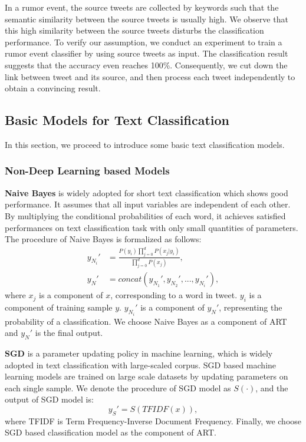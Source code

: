 In a rumor event, the source tweets are collected by keywords such that the semantic similarity between the source tweets is usually high. We observe that this high similarity between the source tweets disturbs the classification performance. To verify our assumption, we conduct an experiment to train a rumor event classifier by using source tweets as input. The classification result suggests that the accuracy even reaches 100\%. Consequently, we cut down the link between tweet and its source, and then process each tweet independently to obtain a convincing result. 

\subsection{Basic Models for Text Classification}
\label{sec:deeplearning_model} 
In this section, we proceed to introduce some basic text classification models.

\subsubsection{Non-Deep Learning based Models}
\textbf{Naive Bayes} \cite{DBLP:journals/ml/DomingosP97} is widely adopted for short text classification which shows good performance. It assumes that all input variables are independent of each other. By multiplying the conditional probabilities of each word, it achieves satisfied performances on text classification task with only small quantities of parameters. The procedure of Naive Bayes is formalized as follows:
\begin{align}\label{eq:nb}
y_{N_{i}}' &= \frac{P(y_i)\prod_{j = 0}^d P(x_j|y_i)}{\prod_{j = 0}^d P(x_j)},\\
y_N' &= concat(y_{N_{1}}',y_{N_{2}}',..., y_{N_{i}}'),
\end{align}
where $x_j$ is a component of $x$, corresponding to a word in tweet.  $y_i$ is a component of training sample $y$. $y_{N_{i}}'$ is a component of $y_N'$, representing the probability of a classification. We choose Naive Bayes as  a component of ART and  $y_N'$ is the final output.

\textbf{SGD} \cite{avriel2003nonlinear} is a parameter updating policy in machine learning, which is widely adopted in text classification with large-scaled corpus. SGD based machine learning models are trained on large scale datasets by updating parameters on each single sample. We denote the procedure of SGD model as $S(\cdot)$, and the output of SGD model is:
\begin{equation}\label{eq:sgd}
y_S' = S(TFIDF(x)),
\end{equation}
where TFIDF is Term Frequency-Inverse Document Frequency. Finally, we choose SGD based classification model as the component of ART.

